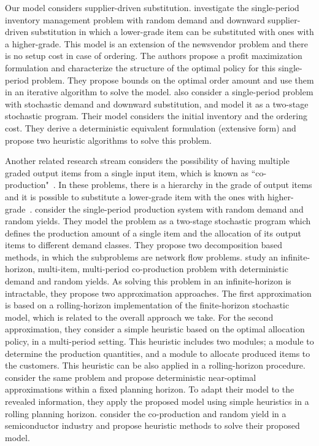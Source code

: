 \documentclass[msom]{oo}
\begin{document}
Our model considers supplier-driven substitution. \cite{bassok1999single} investigate the single-period inventory management problem with random demand and downward supplier-driven substitution in which a lower-grade item can be substituted with  ones with a higher-grade. This model is an extension of the newsvendor problem and there is no setup cost in case of ordering. 
The authors propose a profit maximization formulation and characterize the structure of the optimal policy for this single-period problem. They propose bounds on the optimal order amount and use them in an iterative algorithm to solve the model. \cite{rao2004multi} also consider a single-period problem with stochastic demand and downward substitution, and model it as a two-stage stochastic program. Their model considers the initial inventory and the ordering cost. They derive a deterministic equivalent formulation (extensive form) and propose two heuristic algorithms to solve this problem.

Another related research stream considers the possibility of having multiple graded output items from a single input item, which is known as ``co-production"~\citep{ng2012robust}. In these problems, there is a hierarchy in the grade of output items and it is possible to substitute a lower-grade item with the ones with higher-grade~\citep{bitran1992ordering}. \cite{hsu1999random} consider the single-period production system with random demand and random yields. 
They model the problem as a two-stage stochastic program which defines the production amount of a single item and the allocation of its output items to different demand classes. They propose  %
two decomposition based methods, in which the subproblems are network flow problems. %
 \cite{bitran1992ordering} study an infinite-horizon, multi-item, multi-period co-production problem with deterministic demand and random yields. As solving this problem in an infinite-horizon is intractable, they propose two approximation approaches. %
The first approximation is based on a rolling-horizon implementation of the finite-horizon stochastic model, which is related to the overall approach we take. For the second approximation, they consider a simple heuristic based on the optimal allocation policy, in a multi-period setting. This heuristic includes two modules; a module to determine the production quantities, and a module to allocate produced items to the customers. This heuristic can be also applied in a rolling-horizon procedure. \cite{bitran1992deterministic} consider the same problem and propose deterministic near-optimal approximations within a fixed planning horizon. To adapt their model to the revealed information, they apply the proposed model using simple heuristics in a rolling planning horizon. \cite{bitran1994co} consider the co-production and random yield in a semiconductor industry and propose heuristic methods to solve their proposed model. 
 
\end{document}
